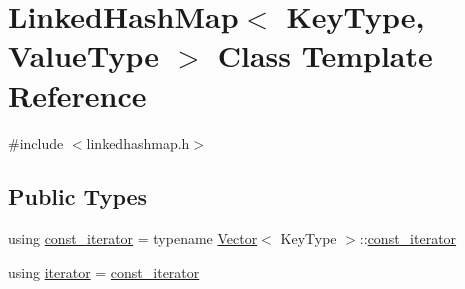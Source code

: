 \hypertarget{classLinkedHashMap}{}\section{Linked\+Hash\+Map$<$ Key\+Type, Value\+Type $>$ Class Template Reference}
\label{classLinkedHashMap}


{\ttfamily \#include $<$linkedhashmap.\+h$>$}

\subsection*{Public Types}
\begin{DoxyCompactItemize}
\item 
using \mbox{\hyperlink{classLinkedHashMap_a40260d13231ddfc81d864ded4ad05c45}{const\+\_\+iterator}} = typename \mbox{\hyperlink{classVector}{Vector}}$<$ Key\+Type $>$\+::\mbox{\hyperlink{classLinkedHashMap_a40260d13231ddfc81d864ded4ad05c45}{const\+\_\+iterator}}
\item 
using \mbox{\hyperlink{classLinkedHashMap_ab3d10e70baaeac78e76b7abae7e2cf76}{iterator}} = \mbox{\hyperlink{classLinkedHashMap_a40260d13231ddfc81d864ded4ad05c45}{const\+\_\+iterator}}
\end{DoxyCompactItemize}
